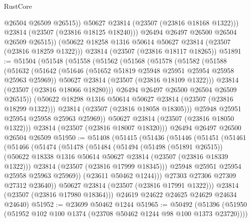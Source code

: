 \begin{lexlean}{RustCore}
\begin{coremodule}
                @26504
                @26509
                @26515))
            @50627
            @23814
            (@23507 (@23816 @18168 @1322)))
          @23814
          (@23507 (@23816 @18125 @18240)))
        @26494
        @26497
        @26500
        @26504
        @26509
        @26515))
    (@50622 @18258 @1316 @50614 @50627 @23814 (@23507 (@23816 @18259 @1322)))
    @23814
    (@23507 (@23816 @18117 @18265))
@51891 := @51504
    (@51548
      (@51558
        (@51562
          (@51568
            (@51578
              (@51582
                (@51588
                  (@51632
                    (@51642
                      (@51646 (@51652 @51819 @25948 @25951 @25954 @25958 @25963 @25969))
                      @50627
                      @23814
                      (@23507 (@23816 @18109 @1322)))
                    @23814
                    (@23507 (@23816 @18066 @18280)))
                  @26494
                  @26497
                  @26500
                  @26504
                  @26509
                  @26515))
              (@50622 @18298 @1316 @50614 @50627 @23814 (@23507 (@23816 @18299 @1322)))
              @23814
              (@23507 (@23816 @18058 @18305)))
            @25948
            @25951
            @25954
            @25958
            @25963
            @25969))
        @50627
        @23814
        (@23507 (@23816 @18050 @1322)))
      @23814
      (@23507 (@23816 @18007 @18320)))
    @26494
    @26497
    @26500
    @26504
    @26509
@51950 := @51408
    (@51415
      (@51436
        (@51446
          (@51451
            (@51461
              (@51466
                (@51474
                  (@51478
                    (@51484
                      (@51494
                        (@51498 (@51891 @26515))
                        (@50622 @18338 @1316 @50614 @50627 @23814 (@23507 (@23816 @18339 @1322)))
                        @23814
                        (@23507 (@23816 @17999 @18345)))
                      @25948
                      @25951
                      @25954
                      @25958
                      @25963
                      @25969))
                  (@23611 @50462 @1244)))
              @27303
              @27306
              @27309
              @27312
              @23640))
          @50627
          @23814
          (@23507 (@23816 @17991 @1322)))
        @23814
        (@23507 (@23816 @17980 @18364)))
      @24619
      @24622
      @24625
      @24629
      @24634
      @24640)
@51952 := @23699 @50462 @1244
@51965 := @50492
    (@51396 (@51950 (@51952 @102 @100 @1374 (@23708 @50462 @1244 @98 @100 @1373 @23720))))

\end{coremodule}
\end{lexlean}
